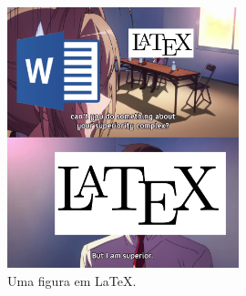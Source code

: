 \documentclass[12pt]{article}
\begin{document}
	\begin{figure}
		\centering
		\includegraphics[width=0.6\textwidth]{meme_superior.png}
		\caption{Uma figura em \LaTeX .}
	\end{figure}
\end{document}
